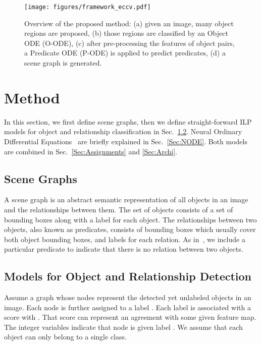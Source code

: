 \documentclass[runningheads]{llncs}
\begin{document}
\begin{figure*}[ht!]
\centering
\texttt{[image: figures/framework\_eccv.pdf]}
\caption{Overview of the proposed method: (a) given an image, many object regions are proposed, (b) those regions are classified by an Object ODE (O-ODE), (c) after pre-processing the features of object pairs, a Predicate ODE (P-ODE) is applied to predict predicates, (d) a scene graph is generated.}
\label{fig:model}
\end{figure*}  

\section{Method} 
\label{Sec:method}

In this section, we first define scene graphs, then we define straight-forward ILP models for object and relationship classification in Sec.~\ref{Sec:VRD.ILP}. Neural Ordinary Differential Equations~\cite{Chen2018:NODE} are briefly explained in Sec.~\ref{Sec:NODE}. Both models are combined in Sec.~\ref{Sec:Assignments} and \ref{Sec:Archi}. 













\subsection{Scene Graphs}
A scene graph \cite{johnson2015image} is an abstract semantic representation of all objects in an image and the relationships between them. 
The set of objects consists of a set of bounding boxes along with a label for each object. The relationships between two objects, also known as predicates, consists of bounding boxes which usually cover both object bounding boxes, and labels for each relation. As in~\cite{zellers2018neural}, we include a particular predicate to indicate that there is no relation between two objects. 






\subsection{Models for Object and Relationship Detection}
\label{Sec:VRD.ILP}
Assume a graph  whose nodes represent the detected yet unlabeled objects in an image. Each node is further assigned to a label . Each label  is associated with a score  with . That score can represent an agreement with some given feature map. 
The integer variables  indicate that node  is given label . We assume that each object can only belong to a single class.
\end{document}
